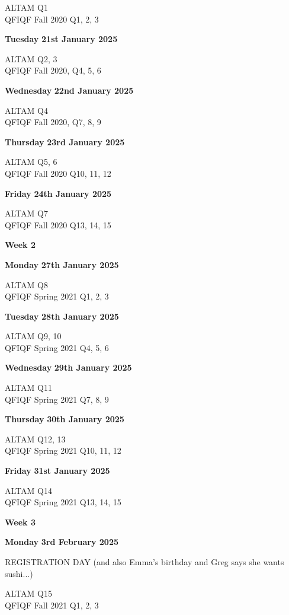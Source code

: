 \documentclass[hidelinks, 12pt]{article}
\theoremstyle{mydefstyle}
\theoremstyle{mythmstyle}
\begin{document}
ALTAM Q1 \\
QFIQF Fall 2020 Q1, 2, 3

\textbf{Tuesday} \hfill \textbf{21st January 2025}

ALTAM Q2, 3 \\
QFIQF Fall 2020, Q4, 5, 6

\textbf{Wednesday} \hfill \textbf{22nd January 2025}

ALTAM Q4 \\
QFIQF Fall 2020, Q7, 8, 9

\textbf{Thursday} \hfill \textbf{23rd January 2025}

ALTAM Q5, 6 \\
QFIQF Fall 2020 Q10, 11, 12

\textbf{Friday} \hfill \textbf{24th January 2025}

ALTAM Q7 \\
QFIQF Fall 2020 Q13, 14, 15

\begin{center}
\textbf{Week 2}
\end{center}

\textbf{Monday} \hfill \textbf{27th January 2025}

ALTAM Q8 \\
QFIQF Spring 2021 Q1, 2, 3

\textbf{Tuesday} \hfill \textbf{28th January 2025}

ALTAM Q9, 10 \\
QFIQF Spring 2021 Q4, 5, 6

\textbf{Wednesday} \hfill \textbf{29th January 2025}

ALTAM Q11 \\
QFIQF Spring 2021 Q7, 8, 9

\textbf{Thursday} \hfill \textbf{30th January 2025}

ALTAM Q12, 13 \\
QFIQF Spring 2021 Q10, 11, 12

\textbf{Friday} \hfill \textbf{31st January 2025}

ALTAM Q14 \\
QFIQF Spring 2021 Q13, 14, 15

\begin{center}
\textbf{Week 3}
\end{center}

\textbf{Monday} \hfill \textbf{3rd February 2025}

REGISTRATION DAY (and also Emma's birthday and Greg says she wants sushi...)

ALTAM Q15 \\
QFIQF Fall 2021 Q1, 2, 3
\end{document}

